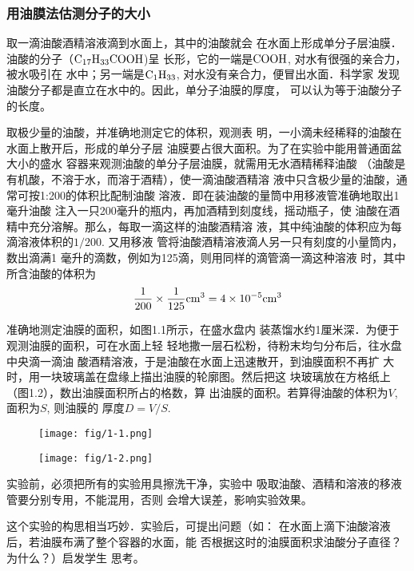 \subsubsection{用油膜法估测分子的大小}

取一滴油酸酒精溶液滴到水面上，其中的油酸就会
在水面上形成单分子层油膜．油酸的分子（$\rm C_{17}H_{33}COOH$)呈
长形，它的一端是$\rm COOH$, 对水有很强的亲合力，被水吸引在
水中；另一端是$\rm C_1H_{33}$, 对水没有亲合力，便冒出水面．科学家
发现油酸分子都是直立在水中的。因此，单分子油膜的厚度，
可以认为等于油酸分子的长度。

取极少量的油酸，并准确地测定它的体积，观测表
明，一小滴未经稀释的油酸在水面上散开后，形成的单分子层
油膜要占很大面积。为了在实验中能用普通面盆大小的盛水
容器来观测油酸的单分子层油膜，就需用无水酒精稀释油酸
（油酸是有机酸，不溶于水，而溶于酒精），使一滴油酸酒精溶
液中只含极少量的油酸，通常可按1:200的体积比配制油酸
溶液．即在装油酸的量筒中用移液管准确地取出1毫升油酸
注入一只200毫升的瓶内，再加酒精到刻度线，摇动瓶子，使
油酸在酒精中充分溶解。那么，每取一滴这样的油酸酒精溶
液，其中纯油酸的体积应为每滴溶液体积的$1/200$. 又用移液
管将油酸酒精溶液滴人另一只有刻度的小量筒内，数出滴满1
毫升的滴数，例如为125滴，则用同样的滴管滴一滴这种溶液
时，其中所含油酸的体积为
\[\frac{1}{200}\times\frac{1}{125}{\rm cm}^3=4\times 10^{-5}{\rm cm}^3\]

准确地测定油膜的面积，如图1.1所示，在盛水盘内
装蒸馏水约1厘米深．为便于观测油膜的面积，可在水面上轻
轻地撒一层石松粉，待粉末均匀分布后，往水盘中央滴一滴油
酸酒精溶液，于是油酸在水面上迅速散开，到油膜面积不再扩
大时，用一块玻璃盖在盘缘上描出油膜的轮廓图。然后把这
块玻璃放在方格纸上（图1.2），数出油膜面积所占的格数，算
出油膜的面积。若算得油酸的体积为$V$, 面积为$S$, 则油膜的
厚度$D=V/S$.
\begin{figure}[htp]\centering
    \begin{minipage}[t]{0.48\textwidth}
    \centering
\texttt{[image: fig/1-1.png]}
    \caption{}
    \end{minipage}
    \begin{minipage}[t]{0.48\textwidth}
    \centering
    \texttt{[image: fig/1-2.png]}
    \caption{}
    \end{minipage}
    \end{figure}

实验前，必须把所有的实验用具擦洗干净，实验中
吸取油酸、酒精和溶液的移液管要分别专用，不能混用，否则
会增大误差，影响实验效果。

这个实验的构思相当巧妙．实验后，可提出问题（如：
在水面上滴下油酸溶液后，若油膜布满了整个容器的水面，能
否根据这时的油膜面积求油酸分子直径？为什么？）启发学生
思考。

